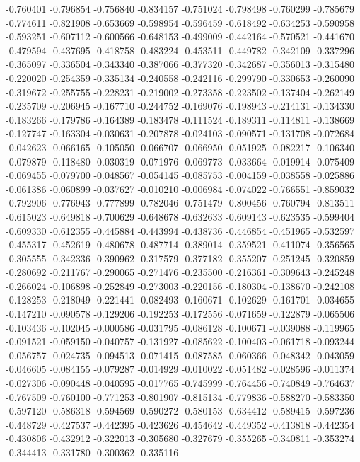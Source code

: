 -0.760401
-0.796854
-0.756840
-0.834157
-0.751024
-0.798498
-0.760299
-0.785679
-0.774611
-0.821908
-0.653669
-0.598954
-0.596459
-0.618492
-0.634253
-0.590958
-0.593251
-0.607112
-0.600566
-0.648153
-0.499009
-0.442164
-0.570521
-0.441670
-0.479594
-0.437695
-0.418758
-0.483224
-0.453511
-0.449782
-0.342109
-0.337296
-0.365097
-0.336504
-0.343340
-0.387066
-0.377320
-0.342687
-0.356013
-0.315480
-0.220020
-0.254359
-0.335134
-0.240558
-0.242116
-0.299790
-0.330653
-0.260090
-0.319672
-0.255755
-0.228231
-0.219002
-0.273358
-0.223502
-0.137404
-0.262149
-0.235709
-0.206945
-0.167710
-0.244752
-0.169076
-0.198943
-0.214131
-0.134330
-0.183266
-0.179786
-0.164389
-0.183478
-0.111524
-0.189311
-0.114811
-0.138669
-0.127747
-0.163304
-0.030631
-0.207878
-0.024103
-0.090571
-0.131708
-0.072684
-0.042623
-0.066165
-0.105050
-0.066707
-0.066950
-0.051925
-0.082217
-0.106340
-0.079879
-0.118480
-0.030319
-0.071976
-0.069773
-0.033664
-0.019914
-0.075409
-0.069455
-0.079700
-0.048567
-0.054145
-0.085753
-0.004159
-0.038558
-0.025886
-0.061386
-0.060899
-0.037627
-0.010210
-0.006984
-0.074022
-0.766551
-0.859032
-0.792906
-0.776943
-0.777899
-0.782046
-0.751479
-0.800456
-0.760794
-0.813511
-0.615023
-0.649818
-0.700629
-0.648678
-0.632633
-0.609143
-0.623535
-0.599404
-0.609330
-0.612355
-0.445884
-0.443994
-0.438736
-0.446854
-0.451965
-0.532597
-0.455317
-0.452619
-0.480678
-0.487714
-0.389014
-0.359521
-0.411074
-0.356565
-0.305555
-0.342336
-0.390962
-0.317579
-0.377182
-0.355207
-0.251245
-0.320859
-0.280692
-0.211767
-0.290065
-0.271476
-0.235500
-0.216361
-0.309643
-0.245248
-0.266024
-0.106898
-0.252849
-0.273003
-0.220156
-0.180304
-0.138670
-0.242108
-0.128253
-0.218049
-0.221441
-0.082493
-0.160671
-0.102629
-0.161701
-0.034655
-0.147210
-0.090578
-0.129206
-0.192253
-0.172556
-0.071659
-0.122879
-0.065506
-0.103436
-0.102045
-0.000586
-0.031795
-0.086128
-0.100671
-0.039088
-0.119965
-0.091521
-0.059150
-0.040757
-0.131927
-0.085622
-0.100403
-0.061718
-0.093244
-0.056757
-0.024735
-0.094513
-0.071415
-0.087585
-0.060366
-0.048342
-0.043059
-0.046605
-0.084155
-0.079287
-0.014929
-0.010022
-0.051482
-0.028596
-0.011374
-0.027306
-0.090448
-0.040595
-0.017765
-0.745999
-0.764456
-0.740849
-0.764637
-0.767509
-0.760100
-0.771253
-0.801907
-0.815134
-0.779836
-0.588270
-0.583350
-0.597120
-0.586318
-0.594569
-0.590272
-0.580153
-0.634412
-0.589415
-0.597236
-0.448729
-0.427537
-0.442395
-0.423626
-0.454642
-0.449352
-0.413818
-0.442354
-0.430806
-0.432912
-0.322013
-0.305680
-0.327679
-0.355265
-0.340811
-0.353274
-0.344413
-0.331780
-0.300362
-0.335116
